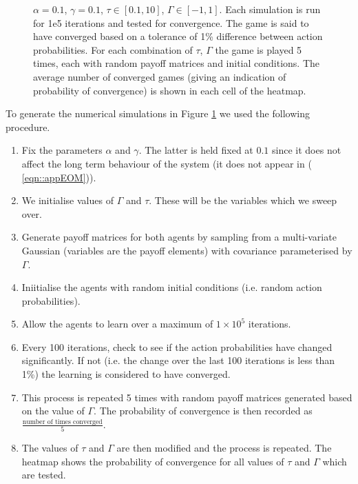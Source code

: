 \documentclass[.../main.tex]{subfiles}
\begin{document}
\begin{figure}[h]
	\caption{$\alpha = 0.1$, $\gamma = 0.1$, $\tau \in [0.1, 10]$, $\Gamma \in [-1, 1]$. Each
	simulation is run for 1e5 iterations and tested for convergence. The game is said to have
	converged based on a tolerance of 1\% difference between action probabilities. For each
	combination of $\tau$, $\Gamma$ the game is played 5 times, each with random payoff matrices
	and initial conditions. The average number of converged games (giving an indication of
	probability of convergence) is shown in each cell of the heatmap. \label{fig::appToys}}
\end{figure}


To generate the numerical simulations in Figure \ref{fig::appToys} we used the following procedure.

\begin{enumerate}
	\item Fix the parameters $\alpha$ and $\gamma$. The latter is held fixed at $0.1$ since
	it does not affect the long term behaviour of the system (it does not appear in (
	\ref{eqn::appEOM})).
	\item We initialise values of $\Gamma$ and $\tau$. These will be the variables which we sweep
	over.
	\item Generate payoff matrices for both agents by sampling from a multi-variate Gaussian 
	(variables are the payoff elements) with covariance parameterised by $\Gamma$.
	\item Iniitialise the agents with random initial conditions (i.e. random action probabilities).
	\item Allow the agents to learn over a maximum of $1 \times 10^5$ iterations.
	\item Every 100 iterations, check to see if the action probabilities have changed significantly.
	If not (i.e. the change over the last 100 iterations is less than 1\%) the learning is
	considered to have converged.
	\item This process is repeated 5 times with random payoff matrices generated based on the value
	of $\Gamma$. The probability of convergence is then recorded as $\frac{\text{number of times
	converged}}{5}$.
	\item The values of $\tau$ and $\Gamma$ are then modified and the process is repeated. The
	heatmap shows the probability of convergence for all values of $\tau$ and $\Gamma$ which are
	tested.
\end{enumerate}
\end{document}
